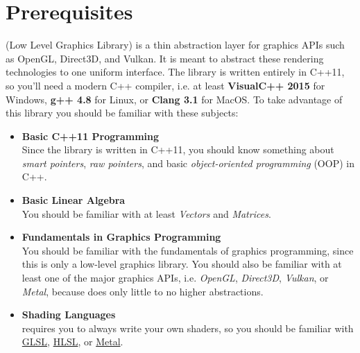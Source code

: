 \documentclass{article}
\begin{document}

\newpage
\section{Prerequisites}

\LLGL (Low Level Graphics Library) is a thin abstraction layer for graphics APIs such as
OpenGL, Direct3D, and Vulkan. It is meant to abstract these rendering technologies to one uniform interface.
The library is written entirely in C++11, so you'll
need a modern C++ compiler, i.e. at least \textbf{VisualC++ 2015} for Windows,
\textbf{g++ 4.8} for Linux, or \textbf{Clang 3.1} for MacOS.
To take advantage of this library you should be familiar with these subjects:
\begin{itemize}
	\item \textbf{Basic C++11 Programming} \\
	Since the library is written in C++11, you should know something about \emph{smart pointers},
	\emph{raw pointers}, and basic \emph{object-oriented programming} (OOP) in C++.

	\item \textbf{Basic Linear Algebra} \\
	You should be familiar with at least \emph{Vectors} and \emph{Matrices}.

	\item \textbf{Fundamentals in Graphics Programming} \\
	You should be familiar with the fundamentals of graphics programming, since this is only a low-level graphics library.
	You should also be familiar with at least one of the major graphics APIs,
	i.e. \emph{OpenGL}, \emph{Direct3D}, \emph{Vulkan}, or \emph{Metal},
	because \LLGL does only little to no higher abstractions.

	\item \textbf{Shading Languages} \\
	\LLGL requires you to always write your own shaders, so you should be familiar with
	\href{https://www.khronos.org/opengl/wiki/OpenGL_Shading_Language}{GLSL},
	\href{https://docs.microsoft.com/en-us/windows/desktop/direct3dhlsl/dx-graphics-hlsl}{HLSL},
	or \href{https://developer.apple.com/metal/Metal-Shading-Language-Specification.pdf}{Metal}.
\end{itemize}
\end{document}

